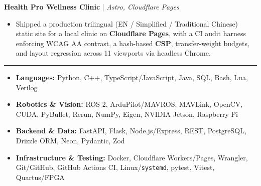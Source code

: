 \documentclass[10pt,letterpaper]{article}
\newcommand{\resumesection}[1]{\par\vspace{5pt}{\bfseries\fontsize{10.5}{11}\selectfont #1}\par\vspace{1pt}\hrule\vspace{3pt}}
\begin{document}
\textbf{Health Pro Wellness Clinic} | \textit{Astro, Cloudflare Pages}\par
\begin{itemize}
\item Shipped a production trilingual (EN / Simplified / Traditional Chinese) static site for a local clinic on \textbf{Cloudflare Pages}, with a CI audit harness enforcing WCAG AA contrast, a hash-based \textbf{CSP}, transfer-weight budgets, and layout regression across 11 viewports via headless Chrome.
\end{itemize}
\resumesection{SKILLS}
\begin{itemize}
\item \textbf{Languages:} Python, C++, TypeScript/JavaScript, Java, SQL, Bash, Lua, Verilog
\item \textbf{Robotics \& Vision:} ROS 2, ArduPilot/MAVROS, MAVLink, OpenCV, CUDA, PyBullet, Rerun, NumPy, Eigen, NVIDIA Jetson, Raspberry Pi
\item \textbf{Backend \& Data:} FastAPI, Flask, Node.js/Express, REST, PostgreSQL, Drizzle ORM, Neon, Pydantic, Zod
\item \textbf{Infrastructure \& Testing:} Docker, Cloudflare Workers/Pages, Wrangler, Git/GitHub, GitHub Actions CI, Linux/\texttt{systemd}, pytest, Vitest, Quartus/FPGA
\end{itemize}
\end{document}
